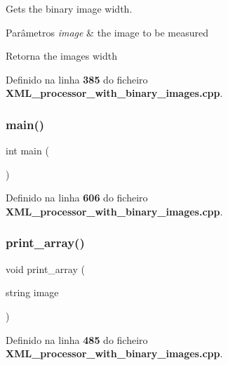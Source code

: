 Gets the binary image width. 


\begin{DoxyParams}{Parâmetros}
{\em image} & the image to be measured \\
\hline
\end{DoxyParams}
\begin{DoxyReturn}{Retorna}
the image\textquotesingle{}s width 
\end{DoxyReturn}


Definido na linha \textbf{ 385} do ficheiro \textbf{ X\+M\+L\+\_\+processor\+\_\+with\+\_\+binary\+\_\+images.\+cpp}.

\mbox{\label{_x_m_l__processor__with__binary__images_8cpp_ae66f6b31b5ad750f1fe042a706a4e3d4}} 
\subsubsection{main()}
{\footnotesize\ttfamily int main (\begin{DoxyParamCaption}{ }\end{DoxyParamCaption})}



Definido na linha \textbf{ 606} do ficheiro \textbf{ X\+M\+L\+\_\+processor\+\_\+with\+\_\+binary\+\_\+images.\+cpp}.

\mbox{\label{_x_m_l__processor__with__binary__images_8cpp_ac2b7ae7f131e19471daf077e84c64648}} 
\subsubsection{print\+\_\+array()}
{\footnotesize\ttfamily void print\+\_\+array (\begin{DoxyParamCaption}\item[{string}]{image }\end{DoxyParamCaption})}



Definido na linha \textbf{ 485} do ficheiro \textbf{ X\+M\+L\+\_\+processor\+\_\+with\+\_\+binary\+\_\+images.\+cpp}.

